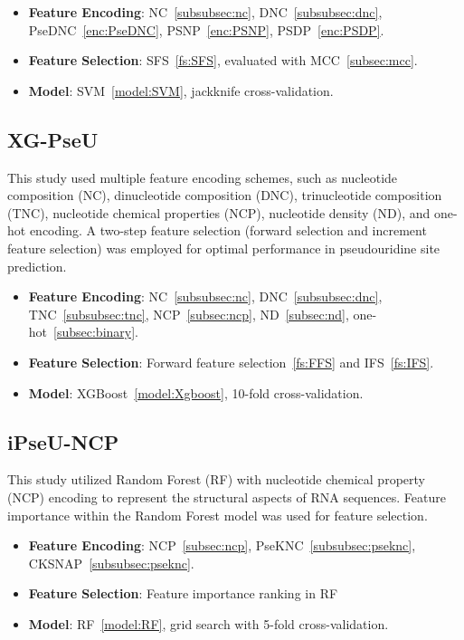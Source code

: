       \begin{itemize}
        \item \textbf{Feature Encoding}: NC~\ref{subsubsec:nc}, DNC~\ref{subsubsec:dnc}, PseDNC~\ref{enc:PseDNC}, PSNP~\ref{enc:PSNP}, PSDP~\ref{enc:PSDP}.
        \item \textbf{Feature Selection}: SFS~\ref{fs:SFS}, evaluated with MCC~\ref{subsec:mcc}.
        \item \textbf{Model}: SVM~\ref{model:SVM}, jackknife cross-validation.
      \end{itemize}

    \subsection*{XG-PseU \cite{liu_xg-pseu_2020}}\label{subsec:XG-PseU}
      This study used multiple feature encoding schemes, such as nucleotide composition (NC), dinucleotide composition (DNC), trinucleotide composition (TNC), nucleotide chemical properties (NCP), nucleotide density (ND), and one-hot encoding.
      A two-step feature selection (forward selection and increment feature selection) was employed for optimal performance in pseudouridine site prediction.

      \begin{itemize}
        \item \textbf{Feature Encoding}: NC~\ref{subsubsec:nc}, DNC~\ref{subsubsec:dnc}, TNC~\ref{subsubsec:tnc}, NCP~\ref{subsec:ncp}, ND~\ref{subsec:nd}, one-hot~\ref{subsec:binary}.
        \item \textbf{Feature Selection}: Forward feature selection~\ref{fs:FFS} and IFS~\ref{fs:IFS}.
        \item \textbf{Model}: XGBoost~\ref{model:Xgboost}, 10-fold cross-validation.
      \end{itemize}

    \subsection*{iPseU-NCP \cite{nguyen-vo_ipseu-ncp_2019}}\label{subsec:ipseu_ncp}
      This study utilized Random Forest (RF) with nucleotide chemical property (NCP) encoding to represent the structural aspects of RNA sequences.
      Feature importance within the Random Forest model was used for feature selection.

      \begin{itemize}
        \item \textbf{Feature Encoding}: NCP~\ref{subsec:ncp}, PseKNC~\ref{subsubsec:pseknc}, CKSNAP~\ref{subsubsec:pseknc}.
        \item \textbf{Feature Selection}: Feature importance ranking in RF
        \item \textbf{Model}: RF~\ref{model:RF}, grid search with 5-fold cross-validation.
      \end{itemize}

